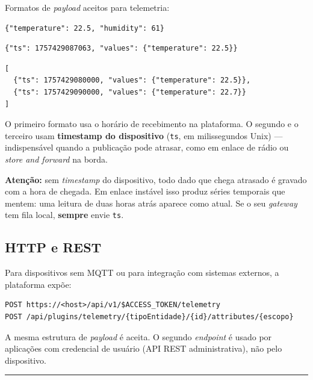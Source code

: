 Formatos de \emph{payload} aceitos para telemetria:

\begin{lstlisting}
{"temperature": 22.5, "humidity": 61}
\end{lstlisting}

\begin{lstlisting}
{"ts": 1757429087063, "values": {"temperature": 22.5}}
\end{lstlisting}

\begin{lstlisting}
[
  {"ts": 1757429080000, "values": {"temperature": 22.5}},
  {"ts": 1757429090000, "values": {"temperature": 22.7}}
]
\end{lstlisting}

O primeiro formato usa o horário de recebimento na plataforma. O segundo e o terceiro usam \textbf{timestamp do dispositivo} (\passthrough{\lstinline!ts!}, em milissegundos Unix) --- indispensável quando a publicação pode atrasar, como em enlace de rádio ou \emph{store and forward} na borda.

\begin{caixaatencao}

\textbf{Atenção:} sem \emph{timestamp} do dispositivo, todo dado que chega atrasado é gravado com a hora de chegada. Em enlace instável isso produz séries temporais que mentem: uma leitura de duas horas atrás aparece como atual. Se o seu \emph{gateway} tem fila local, \textbf{sempre} envie \passthrough{\lstinline!ts!}.

\end{caixaatencao}

\subsection{HTTP e REST}\label{http-e-rest}

Para dispositivos sem MQTT ou para integração com sistemas externos, a plataforma expõe:

\begin{lstlisting}
POST https://<host>/api/v1/$ACCESS_TOKEN/telemetry
POST /api/plugins/telemetry/{tipoEntidade}/{id}/attributes/{escopo}
\end{lstlisting}

A mesma estrutura de \emph{payload} é aceita. O segundo \emph{endpoint} é usado por aplicações com credencial de usuário (API REST administrativa), não pelo dispositivo.

\begin{center}\rule{0.5\linewidth}{0.5pt}\end{center}

